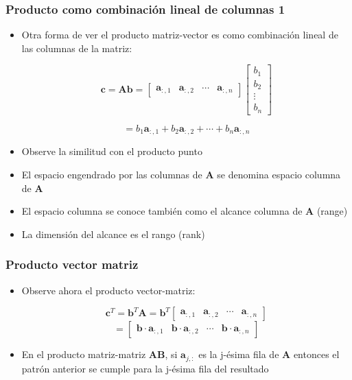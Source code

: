 \documentclass{beamer}
\begin{document}
\begin{frame}
\frametitle{Producto como combinación lineal de columnas 1}
\begin{itemize}
\item Otra forma de ver el producto matriz-vector es como combinación lineal de las columnas de la matriz:
 
\begin{equation*}
\boldsymbol{c} =\boldsymbol{Ab}=\begin{bmatrix} \boldsymbol{a}_{:,1}  & \boldsymbol{a}_{:,2} & \cdots & \boldsymbol{a}_{:,n}   \end{bmatrix} \begin{bmatrix} b_{1}  \\ b_{2}  \\ \vdots \\ b_{n}  \end{bmatrix} 
\end{equation*}

\begin{equation*}
=b_{1}\boldsymbol{a}_{:,1}  + b_{2}\boldsymbol{a}_{:,2} + \cdots + b_{n}\boldsymbol{a}_{:,n} 
\end{equation*}

\item Observe la similitud con el producto punto
\item El espacio engendrado por las columnas de $\boldsymbol{A}$ se denomina espacio columna de  $\boldsymbol{A}$
\item El espacio columna se conoce también como el alcance columna de $\boldsymbol{A}$ (range)
\item La dimensión del alcance es el rango (rank)
\end{itemize}
\end{frame}
\begin{frame}
\frametitle{Producto vector matriz}
\begin{itemize}
\item Observe ahora el producto vector-matriz:
 
\begin{equation*}
\boldsymbol{c}^T =\boldsymbol{b}^T\boldsymbol{A}= \boldsymbol{b}^T \begin{bmatrix} \boldsymbol{a}_{:,1}  & \boldsymbol{a}_{:,2} & \cdots & \boldsymbol{a}_{:,n}   \end{bmatrix}
\end{equation*}
\begin{equation*}
=\begin{bmatrix} \boldsymbol{b} \cdot \boldsymbol{a}_{:,1}  & \boldsymbol{b} \cdot \boldsymbol{a}_{:,2} & \cdots & \boldsymbol{b} \cdot \boldsymbol{a}_{:,n}   \end{bmatrix} 
\end{equation*}

\item En el producto matriz-matriz $\boldsymbol{AB}$, si $\boldsymbol{a}_{j,:}$ es la j-ésima fila de $\boldsymbol{A}$ entonces el patrón anterior se cumple para la j-ésima fila del resultado
\end{itemize}
\end{frame}
\end{document}
